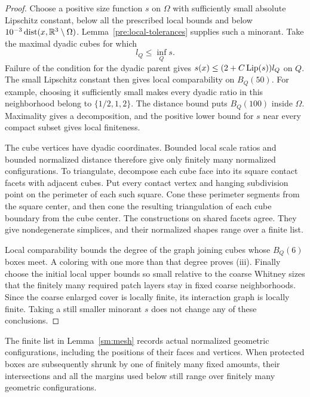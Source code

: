\begin{proof}
Choose a positive size function $s$ on $\Omega$ with sufficiently
small absolute Lipschitz constant, below all the prescribed local
bounds and below $10^{-3}\operatorname{dist}(x,\mathbb R^3\setminus\Omega)$.
Lemma~\ref{pre:local-tolerances} supplies such a minorant.  Take the
maximal dyadic cubes for which
\[
 l_Q\le\inf_Qs.
\]
Failure of the condition for the dyadic parent gives
$s(x)\le(2+C\operatorname{Lip}(s))l_Q$ on $Q$.  The small Lipschitz constant
then gives local comparability on $B_Q(50)$.  For example, choosing
it sufficiently small makes every dyadic ratio in this neighborhood
belong to $\{1/2,1,2\}$.  The distance bound puts $B_Q(100)$ inside
$\Omega$.  Maximality gives a decomposition, and the positive lower
bound for $s$ near every compact subset gives local finiteness.

The cube vertices have dyadic coordinates.  Bounded local scale
ratios and bounded normalized distance therefore give only finitely
many normalized configurations.  To triangulate, decompose each
cube face into its square contact facets with adjacent cubes.
Put every contact vertex and hanging subdivision point on the
perimeter of each such square.  Cone these perimeter segments from
the square center, and then cone the resulting triangulation of
each cube boundary from the cube center.  The constructions on
shared facets agree.  They give nondegenerate simplices, and their
normalized shapes range over a finite list.

Local comparability bounds the degree of the graph joining cubes
whose $B_Q(6)$ boxes meet.  A coloring with one more than that
degree proves \textup{(iii)}.  Finally choose the initial local
upper bounds so small relative to the coarse Whitney sizes that
the finitely many required patch layers stay in fixed coarse
neighborhoods.  Since the coarse enlarged cover is locally finite,
its interaction graph is locally finite.  Taking a still smaller
minorant $s$ does not change any of these conclusions.
\end{proof}

The finite list in Lemma~\ref{sm:mesh} records actual normalized
geometric configurations, including the positions of their faces and
vertices.  When protected boxes are subsequently shrunk by one of
finitely many fixed amounts, their intersections and all the margins
used below still range over finitely many geometric configurations.

